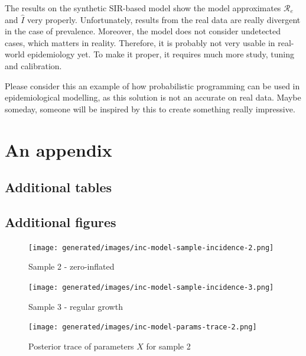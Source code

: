 \documentclass[
  digital, %
  oneside, %
  lof,     %
  lot,     %
]{fithesis4}
\begin{document}
The results on the synthetic SIR-based model show the model approximates $\mathcal{R}_e$ and $\hat{I}$ very properly.
Unfortunately, results from the real data are really divergent in the case of prevalence.
Moreover, the model does not consider undetected cases, which matters in reality.
Therefore, it is probably not very usable in real-world epidemiology yet.
To make it proper, it requires much more study, tuning and calibration.

Please consider this an example of how probabilistic programming can be used in epidemiological modelling, as this solution is not an accurate on real data.
Maybe someday, someone will be inspired by this to create something really impressive.


\printbibliography[heading=bibintoc]

\appendix

\chapter{An appendix}


\section{Additional tables}





\section{Additional figures}

\begin{figure}[H]
  \begin{center}
    \texttt{[image: generated/images/inc-model-sample-incidence-2.png]}
  \end{center}
  \caption{Sample 2 - zero-inflated}
  \label{fig:dev-incidence-2}
\end{figure}

\begin{figure}[H]
  \begin{center}
    \texttt{[image: generated/images/inc-model-sample-incidence-3.png]}
  \end{center}
  \caption{Sample 3 - regular growth}
  \label{fig:dev-incidence-3}
\end{figure}



\begin{figure}[H]
  \begin{center}
    \texttt{[image: generated/images/inc-model-params-trace-2.png]}
  \end{center}
  \caption{Posterior trace of parameters $X$ for sample 2}
  \label{fig:params-trace-2}
\end{figure}
\end{document}
